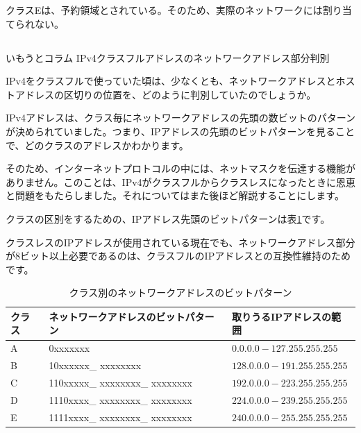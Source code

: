 クラスEは、予約領域とされている。そのため、実際のネットワークには割り当てられない。

\subsection*{}
\begin{itembox}[l]{いもうとコラム IPv4クラスフルアドレスのネットワークアドレス部分判別}

IPv4をクラスフルで使っていた頃は、少なくとも、ネットワークアドレスとホストアドレスの区切りの位置を、どのように判別していたのでしょうか。

IPv4アドレスは、クラス毎にネットワークアドレスの先頭の数ビットのパターンが決められていました。つまり、IPアドレスの先頭のビットパターンを見ることで、どのクラスのアドレスかわかります。

そのため、インターネットプロトコルの中には、ネットマスクを伝達する機能がありません。このことは、IPv4がクラスフルからクラスレスになったときに恩恵と問題をもたらしました。それについてはまた後ほど解説することにします。

クラスの区別をするための、IPアドレス先頭のビットパターンは表\ref{bitpattern}です。



クラスレスのIPアドレスが使用されている現在でも、ネットワークアドレス部分が8ビット以上必要であるのは、クラスフルのIPアドレスとの互換性維持のためです。


\end{itembox}

\begin{table}[hbtp] \caption{クラス別のネットワークアドレスのビットパターン} \label{bitpattern}
\begin{center}
\begin{tabularx}{110mm}{lll} \toprule
クラス & ネットワークアドレスのビットパターン & 取りうるIPアドレスの範囲\\ \midrule
A & 0xxxxxxx & $0.0.0.0-127.255.255.255$\\
B & 10xxxxxx\_ xxxxxxxx & $128.0.0.0-191.255.255.255$\\
C & 110xxxxx\_ xxxxxxxx\_ xxxxxxxx & $192.0.0.0-223.255.255.255$\\
D & 1110xxxx\_ xxxxxxxx\_ xxxxxxxx & $224.0.0.0-239.255.255.255$\\
E & 1111xxxx\_ xxxxxxxx\_ xxxxxxxx & $240.0.0.0-255.255.255.255$\\ \bottomrule
\end{tabularx}
\end{center}
\end{table}


